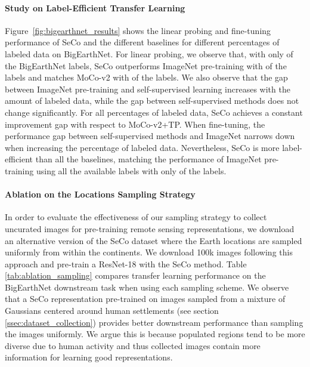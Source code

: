 \documentclass[10pt,twocolumn,letterpaper]{article}
\newcommand{\methodname}[0]{SeCo}
\begin{document}
\vspace{-1em}\paragraph{Study on Label-Efficient Transfer Learning}
Figure~\ref{fig:bigearthnet_results} shows the linear probing and fine-tuning performance of \methodname{} and the different baselines for different percentages of labeled data on BigEarthNet. For linear probing, we observe that, with only  of the BigEarthNet labels, \methodname{} outperforms ImageNet pre-training with  of the labels and matches MoCo-v2 with  of the labels. We also observe that the gap between ImageNet pre-training and self-supervised learning increases with the amount of labeled data, while the gap between self-supervised methods does not change significantly. For all percentages of labeled data, \methodname{} achieves a constant  improvement gap with respect to MoCo-v2+TP. When fine-tuning, the performance gap between self-supervised methods and ImageNet narrows down when increasing the percentage of labeled data. Nevertheless, \methodname{} is more label-efficient than all the baselines, matching the performance of ImageNet pre-training using all the available labels with only  of the labels.



\vspace{-1em}\paragraph{Ablation on the Locations Sampling Strategy}
In order to evaluate the effectiveness of our sampling strategy to collect uncurated images for pre-training remote sensing representations, we download an alternative version of the \methodname{} dataset where the Earth locations are sampled uniformly from within the continents. We download 100k images following this approach and pre-train a ResNet-18 with the \methodname{} method. Table \ref{tab:ablation_sampling} compares transfer learning performance on the BigEarthNet downstream task when using each sampling scheme. We observe that a \methodname{} representation pre-trained on images sampled from a mixture of Gaussians centered around human settlements (see section \ref{ssec:dataset_collection}) provides better downstream performance than sampling the images uniformly. We argue this is because populated regions tend to be more diverse due to human activity and thus collected images contain more information for learning good representations.
\end{document}
